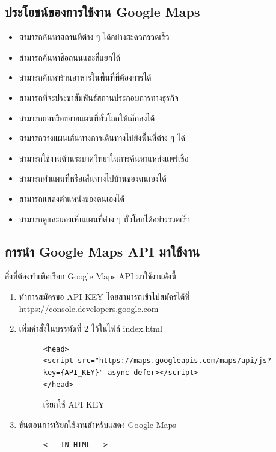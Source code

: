\begin{enumerate}
		\subsection{ประโยชน์ของการใช้งาน Google Maps}
		\begin{itemize}
			\item สามารถค้นหาสถานที่ต่าง ๆ ได้อย่างสะดวกรวดเร็ว
			\item สามารถค้นหาชื่อถนนและสี่แยกได้
			\item สามารถค้นหาร้านอาหารในพื้นที่ที่ต้องการได้
			\item สามารถที่จะประชาสัมพันธ์สถานประกอบการทางธุรกิจ
			\item สามารถย่อหรือขยายแผนที่ทั่วโลกให้เล็กลงได้
			\item สามารถวางแผนเส้นทางการเดินทางไปยังพื้นที่ต่าง ๆ ได้
			\item สามารถใช้งานด้านระบาดวิทยาในการค้นหาแหล่งแพร่เชื้อ
			\item สามารถทำแผนที่หรือเส้นทางไปบ้านของตนเองได้
			\item สามารถแสดงตำแหน่งของตนเองได้
			\item สามารถดูและมองเห็นแผนที่ต่าง ๆ ทั่วโลกได้อย่างรวดเร็ว
		\end{itemize}

		\subsection{การนำ Google Maps API มาใช้งาน}
		สิ่งที่ต้องทำเพื่อเรียก Google Maps API มาใช้งานดังนี้
		\begin{enumerate}
			\item ทำการสมัครขอ API KEY โดยสามารถเข้าไปสมัครได้ที่ https://console.developers.google.com
			\item เพิ่มคำสั่งในบรรทัดที่ 2 ไว้ในไฟล์ index.html
			
			\begin{figure}[H]
				{\begin{lstlisting}
<head>
<script src="https://maps.googleapis.com/maps/api/js?key={API_KEY}" async defer></script>
</head>
				\end{lstlisting}}
			\centering
				\caption{เรียกใช้ API KEY}
				\label{Fig:API Web Speech}
			\end{figure}

			\item ขั้นตอนการเรียกใช้งานสำหรับแสดง Google Maps
			
			\begin{figure}[H]
				{\begin{lstlisting}
<-- IN HTML -->


\end{lstlisting}}
\end{figure}
\end{enumerate}
\end{enumerate}
